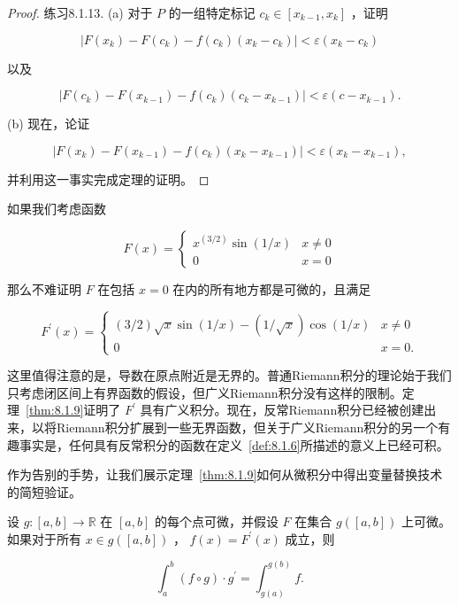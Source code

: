 \begin{proof}
练习8.1.13. (a) 对于 \(P\) 的一组特定标记 \({c}_{k} \in  \left\lbrack  {{x}_{k - 1},{x}_{k}}\right\rbrack\) ，证明

\[
\left| {F\left( {x}_{k}\right)  - F\left( {c}_{k}\right)  - f\left( {c}_{k}\right) \left( {{x}_{k} - {c}_{k}}\right) }\right|  < \varepsilon \left( {{x}_{k} - {c}_{k}}\right)
\]

以及

\[
\left| {F\left( {c}_{k}\right)  - F\left( {x}_{k - 1}\right)  - f\left( {c}_{k}\right) \left( {{c}_{k} - {x}_{k - 1}}\right) }\right|  < \varepsilon \left( {c - {x}_{k - 1}}\right) .
\]

(b) 现在，论证

\[
\left| {F\left( {x}_{k}\right)  - F\left( {x}_{k - 1}\right)  - f\left( {c}_{k}\right) \left( {{x}_{k} - {x}_{k - 1}}\right) }\right|  < \varepsilon \left( {{x}_{k} - {x}_{k - 1}}\right) ,
\]

并利用这一事实完成定理的证明。

\end{proof}


如果我们考虑函数

\[
F\left( x\right)  = \left\{  \begin{array}{ll} {x}^{(3/2)}\sin \left( {1/x}\right) &x \neq  0 \\  0 & x = 0 \end{array}\right.
\]

那么不难证明 \(F\) 在包括 \(x = 0\) 在内的所有地方都是可微的，且满足

\[
{F}^{\prime }\left( x\right)  = \left\{  \begin{array}{ll} \left( {3/2}\right) \sqrt{x}\sin \left( {1/x}\right)  - \left( {1/\sqrt{x}}\right) \cos \left( {1/x}\right) & x \neq  0 \\  0 & x = 0. \end{array}\right.
\]

这里值得注意的是，导数在原点附近是无界的。普通Riemann积分的理论始于我们只考虑闭区间上有界函数的假设，但广义Riemann积分没有这样的限制。定理~\ref{thm:8.1.9}证明了 \({F}^{\prime }\) 具有广义积分。现在，反常Riemann积分已经被创建出来，以将Riemann积分扩展到一些无界函数，但关于广义Riemann积分的另一个有趣事实是，任何具有反常积分的函数在定义~\ref{def:8.1.6}所描述的意义上已经可积。

作为告别的手势，让我们展示定理~\ref{thm:8.1.9}如何从微积分中得出变量替换技术的简短验证。

\begin{Thm}[换元公式]
  \label{thm:8.1.10}
  设 \(g : \left\lbrack  {a,b}\right\rbrack   \rightarrow  \mathbb{R}\) 在 \(\left\lbrack  {a,b}\right\rbrack\) 的每个点可微，并假设 \(F\) 在集合 \(g\left( \left\lbrack  {a,b}\right\rbrack  \right)\) 上可微。如果对于所有 \(x \in  g\left( \left\lbrack  {a,b}\right\rbrack  \right)\) ， \(f\left( x\right)  = {F}^{\prime }\left( x\right)\) 成立，则

\[
{\int }_{a}^{b}\left( {f \circ  g}\right)  \cdot  {g}^{\prime } = {\int }_{g\left( a\right) }^{g\left( b\right) }f.
\]

\end{Thm}

